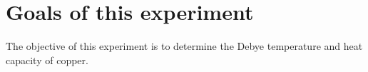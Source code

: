 \section{Goals of this experiment}
\label{sec:Zielsetzung}

The objective of this experiment is to determine the Debye temperature and heat capacity of copper.